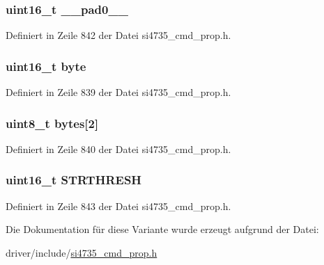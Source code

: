 \subsubsection[{\+\_\+\+\_\+pad0\+\_\+\+\_\+}]{\setlength{\rightskip}{0pt plus 5cm}uint16\+\_\+t \+\_\+\+\_\+pad0\+\_\+\+\_\+}\label{unionfm__blend__rssi__stero__thres_a77132c2c26a75f5b8751b235cda23828}


Definiert in Zeile 842 der Datei si4735\+\_\+cmd\+\_\+prop.\+h.

\hypertarget{unionfm__blend__rssi__stero__thres_ab0549c1b5ea980a02e7eab77e21fea49}{}
\subsubsection[{byte}]{\setlength{\rightskip}{0pt plus 5cm}uint16\+\_\+t byte}\label{unionfm__blend__rssi__stero__thres_ab0549c1b5ea980a02e7eab77e21fea49}


Definiert in Zeile 839 der Datei si4735\+\_\+cmd\+\_\+prop.\+h.

\hypertarget{unionfm__blend__rssi__stero__thres_a46e4c05d20a047ec169f60d3167e912e}{}
\subsubsection[{bytes}]{\setlength{\rightskip}{0pt plus 5cm}uint8\+\_\+t bytes\mbox{[}2\mbox{]}}\label{unionfm__blend__rssi__stero__thres_a46e4c05d20a047ec169f60d3167e912e}


Definiert in Zeile 840 der Datei si4735\+\_\+cmd\+\_\+prop.\+h.

\hypertarget{unionfm__blend__rssi__stero__thres_ae59cc6ed2c20ceb75c5065984e1751d1}{}
\subsubsection[{S\+T\+R\+T\+H\+R\+E\+S\+H}]{\setlength{\rightskip}{0pt plus 5cm}uint16\+\_\+t S\+T\+R\+T\+H\+R\+E\+S\+H}\label{unionfm__blend__rssi__stero__thres_ae59cc6ed2c20ceb75c5065984e1751d1}


Definiert in Zeile 843 der Datei si4735\+\_\+cmd\+\_\+prop.\+h.



Die Dokumentation für diese Variante wurde erzeugt aufgrund der Datei\+:\begin{DoxyCompactItemize}
\item 
driver/include/\hyperlink{si4735__cmd__prop_8h}{si4735\+\_\+cmd\+\_\+prop.\+h}\end{DoxyCompactItemize}
